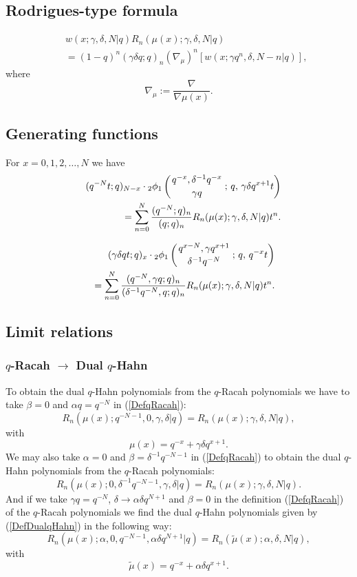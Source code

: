 \documentclass[envcountchap,graybox]{svmono}
\newcounter{rom}
\newcommand{\qhyp}[5]{\mbox{}_{#1}{\phi}_{#2}
\left(\genfrac{}{}{0pt}{}{#3}{#4}\,;\,q,\,#5\right)}
\newcommand{\qhyp}[5]{\,\mbox{}_{#1}\phi_{#2}\!\left(
  \genfrac{}{}{0pt}{}{#3}{#4};#5\right)}
\begin{document}
\subsection*{Rodrigues-type formula}
\begin{eqnarray}
\label{RodDualqHahn}
& &w(x;\gamma,\delta,N|q)R_n(\mu(x);\gamma,\delta,N|q)\nonumber\\
& &{}=(1-q)^n(\gamma\delta q;q)_n
\left(\nabla_{\mu}\right)^n\left[w(x;\gamma q^n,\delta,N-n|q)\right],
\end{eqnarray}
where
$$\nabla_{\mu}:=\frac{\nabla}{\nabla\mu(x)}.$$

\subsection*{Generating functions} For $x=0,1,2,\ldots,N$ we have
\begin{eqnarray}
\label{GenDualqHahn1}
& &(q^{-N}t;q)_{N-x}\cdot\qhyp{2}{1}{q^{-x},\delta^{-1}q^{-x}}{\gamma q}{\gamma\delta q^{x+1}t}\nonumber\\
& &{}=\sum_{n=0}^N\frac{(q^{-N};q)_n}{(q;q)_n}R_n(\mu(x);\gamma,\delta,N|q)t^n.
\end{eqnarray}

\begin{eqnarray}
\label{GenDualqHahn2}
& &(\gamma\delta qt;q)_x\cdot\qhyp{2}{1}{q^{x-N},\gamma q^{x+1}}{\delta^{-1}q^{-N}}{q^{-x}t}\nonumber\\
& &{}=\sum_{n=0}^N
\frac{(q^{-N},\gamma q;q)_n}{(\delta^{-1}q^{-N},q;q)_n}R_n(\mu(x);\gamma,\delta,N|q)t^n.
\end{eqnarray}

\subsection*{Limit relations}

\subsubsection*{$q$-Racah $\rightarrow$ Dual $q$-Hahn}
To obtain the dual $q$-Hahn polynomials from the $q$-Racah polynomials we have to
take $\beta=0$ and $\alpha q=q^{-N}$ in (\ref{DefqRacah}):
$$R_n(\mu(x);q^{-N-1},0,\gamma,\delta|q)=R_n(\mu(x);\gamma,\delta,N|q),$$
with
$$\mu(x)=q^{-x}+\gamma\delta q^{x+1}.$$
We may also take $\alpha=0$ and $\beta=\delta^{-1}q^{-N-1}$ in (\ref{DefqRacah}) to obtain
the dual $q$-Hahn polynomials from the $q$-Racah polynomials:
$$R_n(\mu(x);0,\delta^{-1}q^{-N-1},\gamma,\delta|q)=R_n(\mu(x);\gamma,\delta,N|q).$$
And if we take $\gamma q=q^{-N}$, $\delta\rightarrow\alpha\delta q^{N+1}$ and $\beta=0$ in the
definition (\ref{DefqRacah}) of the $q$-Racah polynomials we find the dual
$q$-Hahn polynomials given by (\ref{DefDualqHahn}) in the following way:
$$R_n(\mu(x);\alpha,0,q^{-N-1},\alpha\delta q^{N+1}|q)=R_n({\tilde \mu}(x);\alpha,\delta,N|q),$$
with
$${\tilde \mu}(x)=q^{-x}+\alpha\delta q^{x+1}.$$
\end{document}
